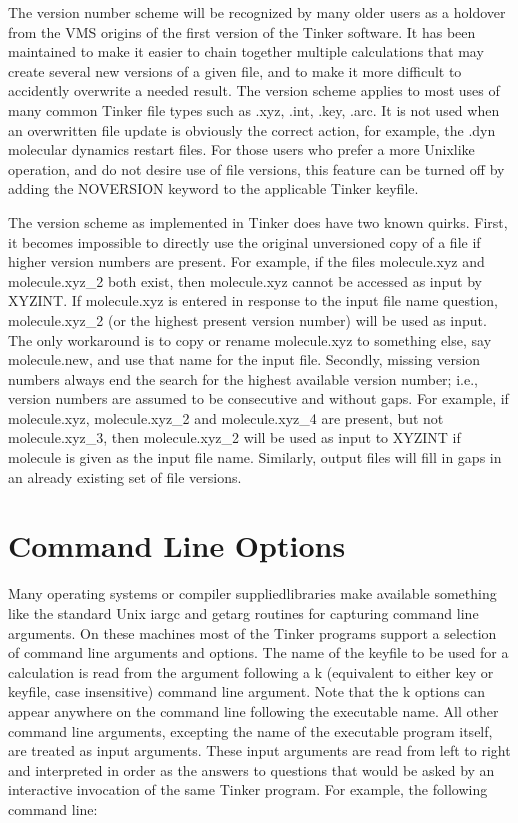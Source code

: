 \documentclass[letterpaper,11pt,english]{sphinxmanual}
\begin{document}
The version number scheme will be recognized by many older users as a holdover from the VMS origins of the first version of the Tinker software. It has been maintained to make it easier to chain together multiple calculations that may create several new versions of a given file, and to make it more difficult to accidently overwrite a needed result. The version scheme applies to most uses of many common Tinker file types such as .xyz, .int, .key, .arc. It is not used when an overwritten file update is obviously the correct action, for example, the .dyn molecular dynamics restart files. For those users who prefer a more Unix\sphinxhyphen{}like operation, and do not desire use of file versions, this feature can be turned off by adding the NOVERSION keyword to the applicable Tinker keyfile.

The version scheme as implemented in Tinker does have two known quirks. First, it becomes impossible to directly use the original unversioned copy of a file if higher version numbers are present. For example, if the files molecule.xyz and molecule.xyz\_2 both exist, then molecule.xyz cannot be accessed as input by XYZINT. If molecule.xyz is entered in response to the input file name question, molecule.xyz\_2 (or the highest present version number) will be used as input. The only workaround is to copy or rename molecule.xyz to something else, say molecule.new, and use that name for the input file. Secondly, missing version numbers always end the search for the highest available version number; i.e., version numbers are assumed to be consecutive and without gaps. For example, if molecule.xyz, molecule.xyz\_2 and molecule.xyz\_4 are present, but not molecule.xyz\_3, then molecule.xyz\_2 will be used as input to XYZINT if molecule is given as the input file name. Similarly, output files will fill in gaps in an already existing set of file versions.


\section{Command Line Options}
\label{\detokenize{text/special-features:command-line-options}}
Many operating systems or compiler supplied\sphinxhyphen{}libraries make available something like the standard Unix iargc and getarg routines for capturing command line arguments. On these machines most of the Tinker programs support a selection of command line arguments and options. The name of the keyfile to be used for a calculation is read from the argument following a \sphinxhyphen{}k (equivalent to either \sphinxhyphen{}key or \sphinxhyphen{}keyfile, case insensitive) command line argument. Note that the \sphinxhyphen{}k options can appear anywhere on the command line following the executable name. All other command line arguments, excepting the name of the executable program itself, are treated as input arguments. These input arguments are read from left to right and interpreted in order as the answers to questions that would be asked by an interactive invocation of the same Tinker program. For example, the following command line:
\end{document}
